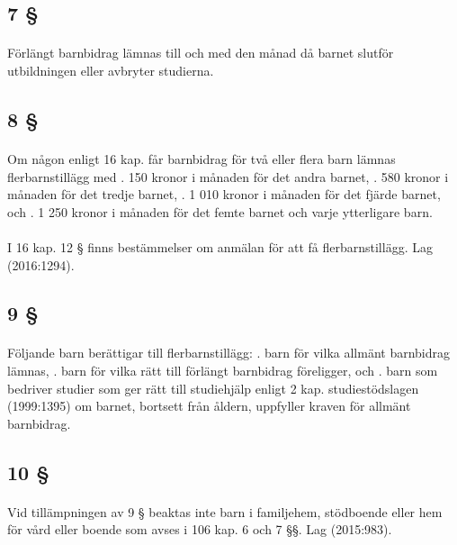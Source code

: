 \documentclass[a4paper,notitlepage,openany,10pt]{book}
\begin{document}
\subsection*{7 §}
\paragraph*{}
Förlängt barnbidrag lämnas till och med den månad då barnet slutför utbildningen eller avbryter studierna.
\subsection*{8 §}
\paragraph*{}
Om någon enligt 16 kap. får barnbidrag för två eller flera barn lämnas flerbarnstillägg med
. 150 kronor i månaden för det andra barnet,
. 580 kronor i månaden för det tredje barnet,
. 1 010 kronor i månaden för det fjärde barnet, och
. 1 250 kronor i månaden för det femte barnet och varje ytterligare barn.
\paragraph*{}
I 16 kap. 12 § finns bestämmelser om anmälan för att få flerbarnstillägg.
Lag (2016:1294).
\subsection*{9 §}
\paragraph*{}
Följande barn berättigar till flerbarnstillägg:
. barn för vilka allmänt barnbidrag lämnas,
. barn för vilka rätt till förlängt barnbidrag föreligger, och
. barn som bedriver studier som ger rätt till studiehjälp enligt 2 kap. studiestödslagen (1999:1395) om barnet, bortsett från åldern, uppfyller kraven för allmänt barnbidrag.
\subsection*{10 §}
\paragraph*{}
Vid tillämpningen av 9 § beaktas inte barn i familjehem, stödboende eller hem för vård eller boende som avses i 106 kap. 6 och 7 §§.
Lag (2015:983).
\end{document}
